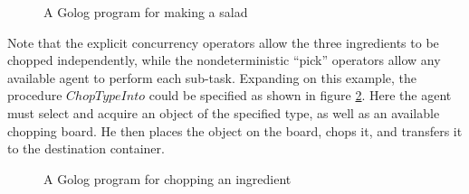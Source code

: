 %
\begin{figure}
\begin{centering}
\par\end{centering}

\caption{A Golog program for making a salad\label{fig:MIndiGolog:MakeSalad}}

\end{figure}


Note that the explicit concurrency operators allow the three ingredients
to be chopped independently, while the nondeterministic {}``pick''
operators allow any available agent to perform each sub-task. Expanding
on this example, the procedure $ChopTypeInto$ could be specified
as shown in figure \ref{fig:MIndiGolog:ChopTypeInto}. Here the agent
must select and acquire an object of the specified type, as well as
an available chopping board. He then places the object on the board,
chops it, and transfers it to the destination container.

%
\begin{figure}
\begin{centering}
\par\end{centering}

\caption{A Golog program for chopping an ingredient\label{fig:MIndiGolog:ChopTypeInto}}

\end{figure}


